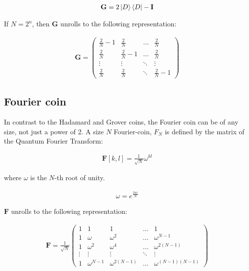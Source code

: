 \begin{align*}
    \mathbf{G} = 2\ket{D}\bra{D} - \mathbf{I}
\end{align*}

If $N = 2^n$, then $\mathbf{G}$ unrolls to the following representation:

\begin{align*}
  \mathbf{G} = \begin{pmatrix}
      \frac{2}{N} - 1 & \frac{2}{N} & \dots  & \frac{2}{N} \\
      \frac{2}{N} & \frac{2}{N} - 1 & \dots  & \frac{2}{N} \\
      \vdots & \vdots & \ddots & \vdots \\
      \frac{2}{N} & \frac{2}{N} & \ddots & \frac{2}{N} - 1
    \end{pmatrix}
\end{align*}

\subsection{Fourier coin}

In contrast to the Hadamard and Grover coins, the Fourier coin can be of any size, not just a power of 2. A size $N$ Fourier-coin, $F_N$ is defined by the matrix of the Quantum Fourier Transform:

\begin{align*}
\mathbf{F}[k,l] = \frac{1}{\sqrt{N}} \omega^{kl}
\end{align*}

where $\omega$ is the $N$-th root of unity.

\begin{align*}
\omega = e^{\frac{2\pi{}i}{N}}
\end{align*}

$\mathbf{F}$ unrolls to the following representation:

\begin{align*}
\mathbf{F} = \frac{1}{\sqrt{N}}
\begin{pmatrix}
  1 & 1 & 1 & \dots & 1 \\
  1 & \omega & \omega^2 & \dots & \omega^{N-1} \\
  1 & \omega^2 & \omega^4 & \dots & \omega^{2(N-1)} \\
  \vdots & \vdots & \vdots & \ddots & \vdots \\
  1 & \omega^{N-1} & \omega^{2(N-1)} & \dots & \omega^{(N-1)(N-1)}
\end{pmatrix}
\end{align*}

